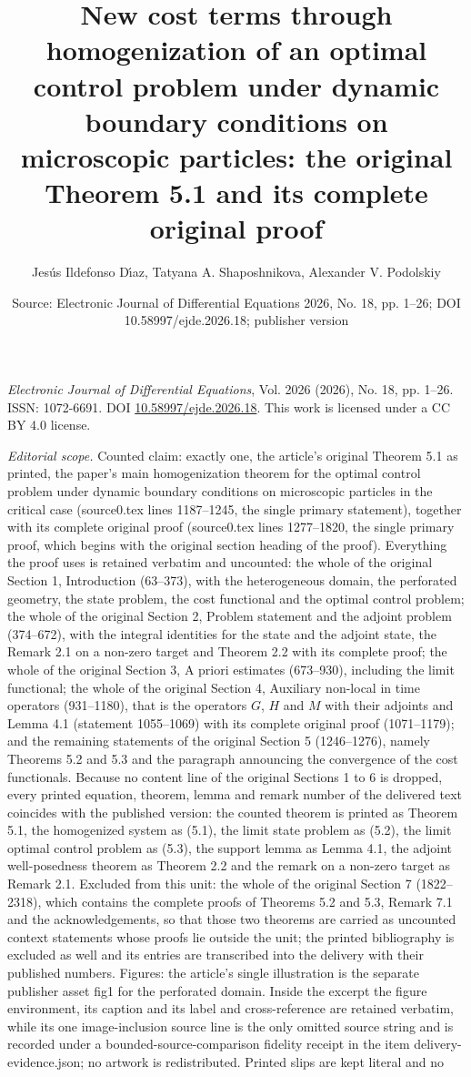 \documentclass[10pt,a4paper]{amsart}
\title[Homogenization of an optimal control problem under dynamic boundary conditions: original Theorem 5.1]{New cost terms through homogenization of an optimal control problem under dynamic boundary conditions on microscopic particles: the original Theorem 5.1 and its complete original proof}
\author{Jes\'us Ildefonso D\'{\i}az, Tatyana A. Shaposhnikova, Alexander V. Podolskiy}
\date{Source: Electronic Journal of Differential Equations 2026, No. 18, pp. 1--26; DOI 10.58997/ejde.2026.18; publisher version}
\numberwithin{equation}{section}
\begin{document}
\maketitle
\noindent\emph{Electronic Journal of Differential Equations}, Vol. 2026 (2026), No. 18, pp. 1--26.\newline
ISSN: 1072-6691. DOI \href{https://doi.org/10.58997/ejde.2026.18}{10.58997/ejde.2026.18}. This work is licensed under a CC BY 4.0 license.\par\smallskip
\noindent\textit{Editorial scope.} Counted claim: exactly one, the article's original Theorem 5.1 as printed, the paper's main homogenization theorem for the optimal control problem under dynamic boundary conditions on microscopic particles in the critical case (source0.tex lines 1187--1245, the single primary statement), together with its complete original proof (source0.tex lines 1277--1820, the single primary proof, which begins with the original section heading of the proof). Everything the proof uses is retained verbatim and uncounted: the whole of the original Section 1, Introduction (63--373), with the heterogeneous domain, the perforated geometry, the state problem, the cost functional and the optimal control problem; the whole of the original Section 2, Problem statement and the adjoint problem (374--672), with the integral identities for the state and the adjoint state, the Remark 2.1 on a non-zero target and Theorem 2.2 with its complete proof; the whole of the original Section 3, A priori estimates (673--930), including the limit functional; the whole of the original Section 4, Auxiliary non-local in time operators (931--1180), that is the operators $G$, $H$ and $M$ with their adjoints and Lemma 4.1 (statement 1055--1069) with its complete original proof (1071--1179); and the remaining statements of the original Section 5 (1246--1276), namely Theorems 5.2 and 5.3 and the paragraph announcing the convergence of the cost functionals. Because no content line of the original Sections 1 to 6 is dropped, every printed equation, theorem, lemma and remark number of the delivered text coincides with the published version: the counted theorem is printed as Theorem 5.1, the homogenized system as (5.1), the limit state problem as (5.2), the limit optimal control problem as (5.3), the support lemma as Lemma 4.1, the adjoint well-posedness theorem as Theorem 2.2 and the remark on a non-zero target as Remark 2.1. Excluded from this unit: the whole of the original Section 7 (1822--2318), which contains the complete proofs of Theorems 5.2 and 5.3, Remark 7.1 and the acknowledgements, so that those two theorems are carried as uncounted context statements whose proofs lie outside the unit; the printed bibliography is excluded as well and its entries are transcribed into the delivery with their published numbers. Figures: the article's single illustration is the separate publisher asset fig1 for the perforated domain. Inside the excerpt the figure environment, its caption and its label and cross-reference are retained verbatim, while its one image-inclusion source line is the only omitted source string and is recorded under a bounded-source-comparison fidelity receipt in the item delivery-evidence.json; no artwork is redistributed. Printed slips are kept literal and no 
\end{document}
